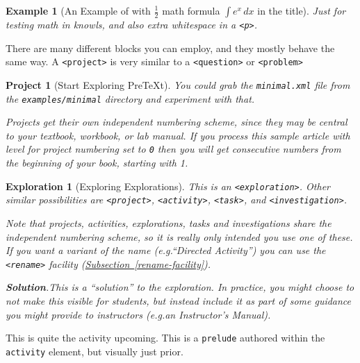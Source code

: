\documentclass[pdflatex]{sn-jnl}
\theoremstyle{thmstyleone}%
\theoremstyle{thmstyletwo}%
\newtheorem{exploration}[theorem]{Exploration}
\newtheorem{example}[theorem]{Example}
\newtheorem{project}[theorem]{Project}
\theoremstyle{thmstylethree}%
\newcommand{\blocktitlefont}{\relax}
\newcommand{\xreffont}{\relax}
\newcommand{\mono}[1]{\texttt{#1}}
\newcommand{\pubtitle}[1]{\textsl{#1}}
\numberwithin{equation}{section}
\begin{document}
\begin{example}[An Example of with \(\frac12\) math formula \(\displaystyle{\int e^x \, dx}\) in the title]\label{example-math-title}%
%
Just for testing math in knowls, and also extra whitespace in a \mono{<p>}.%
\end{example}
There are many different blocks you can employ, and they mostly behave the same way.  A \mono{<project>} is very similar to a \mono{<question>} or \mono{<problem>}%
\begin{project}[Start Exploring PreTeXt]\label{section-interesting-corollary-5-3-8}%
%
You could grab the \mono{minimal.xml} file from the \mono{examples/minimal} directory and experiment with that.%
\par
Projects get their own independent numbering scheme, since they may be central to your textbook, workbook, or lab manual.  If you process this sample article with level for project numbering set to \mono{0} then you will get consecutive numbers from the beginning of your book, starting with 1.%
\end{project}%
\begin{exploration}[Exploring Explorations]\label{section-interesting-corollary-5-3-9}%
%
This is an \mono{<exploration>}.  Other similar possibilities are \mono{<project>}, \mono{<activity>}, \mono{<task>}, and \mono{<investigation>}.%
\par
Note that projects, activities, explorations, tasks and investigations \emph{share} the independent numbering scheme, so it is really only intended you use one of these.  If you want a variant of the name (e.g.\@ ``Directed Activity'') you can use the \mono{<rename>} facility (\hyperref[rename-facility]{Subsection~{\xreffont\ref{rename-facility}}}).%
\par\smallskip%
\noindent\textbf{\blocktitlefont Solution}.\hypertarget{section-interesting-corollary-5-3-9-3}{}\quad{}This is a ``solution'' to the exploration.  In practice, you might choose to not make this visible for students, but instead include it as part of some guidance you might provide to instructors (e.g.\@ an \pubtitle{Instructor's Manual}).%
\end{exploration}%
\par
This is quite the activity upcoming.  This is a \mono{prelude} authored within the \mono{activity} element, but visually just prior.%
\end{document}
